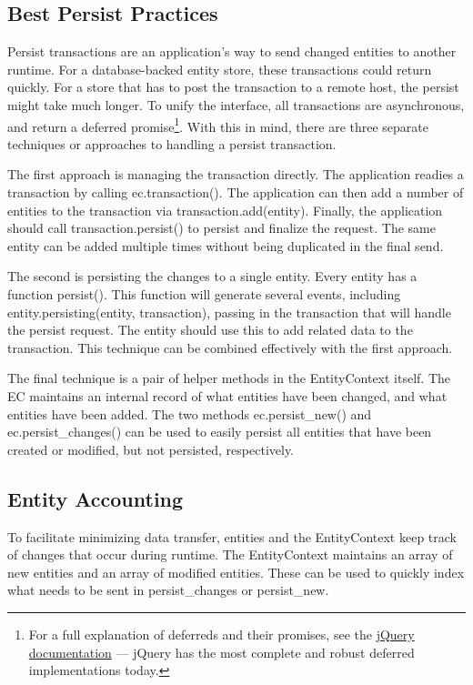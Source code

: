 \documentclass{article}
\renewcommand{\|}{\textbar}
\begin{document}
\subsection{Best Persist Practices}

Persist transactions are an application's way to send changed entities to
another runtime. For a database-backed entity store, these transactions could
return quickly. For a store that has to post the transaction to a remote host,
the persist might take much longer. To unify the interface, all transactions are
asynchronous, and return a deferred promise\footnote{For a full explanation of
deferreds and their promises, see the
\href{http://api.jquery.com/category/deferred-object}{jQuery documentation}
--- jQuery has the most complete and
robust deferred implementations today.}. With this in mind, there are three
separate techniques or approaches to handling a persist transaction.

The first approach is managing the transaction directly. The application readies
a transaction by calling {\ilcode ec.transaction()}. The application can then
add a number of entities to the transaction via {\ilcode
transaction.add(entity)}. Finally, the application should call {\ilcode
transaction.persist()} to persist and finalize the request. The same entity can
be added multiple times without being duplicated in the final send.

The second is persisting the changes to a single entity. Every entity has a
function {\ilcode persist()}. This function will generate several events,
including {\ilcode entity.persisting(entity, transaction)}, passing in the
transaction that will handle the persist request. The entity should use this to
add related data to the transaction. This technique can be combined effectively
with the first approach.

The final technique is a pair of helper methods in the EntityContext itself. The
EC maintains an internal record of what entities have been changed, and what
entities have been added. The two methods {\ilcode ec.persist\_new()} and
{\ilcode ec.persist\_changes()} can be used to easily persist all entities that
have been created or modified, but not persisted, respectively.

\subsection{Entity Accounting}

To facilitate minimizing data transfer, entities and the EntityContext keep
track of changes that occur during runtime. The EntityContext maintains an array
of new entities and an array of modified entities. These can be used to quickly
index what needs to be sent in {\ilcode persist\_changes} or {\ilcode
persist\_new}.
\end{document}
